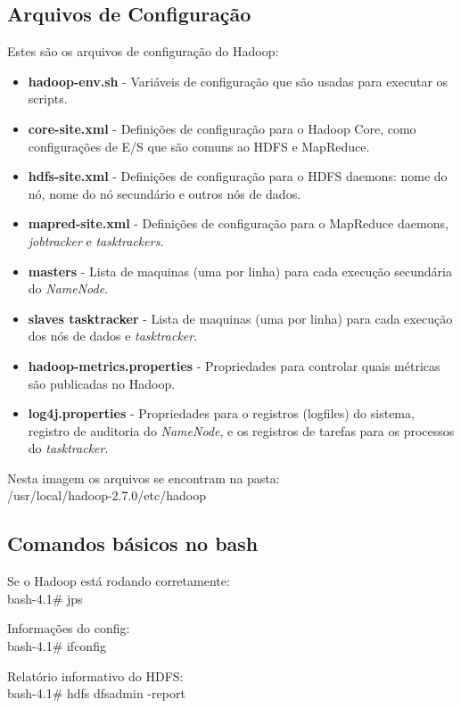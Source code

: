 \documentclass[a4paper,11pt]{article}
\begin{document}
\subsection{Arquivos de Configuração}
Estes são os arquivos de configuração do Hadoop: \vspace{-1em}
\begin{itemize}
	\item \textbf{hadoop-env.sh} - Variáveis de configuração que são usadas para executar os scripts.
	\item \textbf{core-site.xml} - Definições de configuração para o Hadoop Core, como configurações de E/S que são comuns ao HDFS e MapReduce.
	\item \textbf{hdfs-site.xml} - Definições de configuração para o HDFS daemons: nome do nó, nome do nó secundário e outros nós de dados.
	\item \textbf{mapred-site.xml} - Definições de configuração para o MapReduce daemons, \textit{jobtracker} e \textit{tasktrackers}.
	\item \textbf{masters} - Lista de maquinas (uma por linha) para cada execução secundária do \textit{NameNode}.
	\item \textbf{slaves tasktracker} - Lista de maquinas (uma por linha) para cada execução dos nós de dados e \textit{tasktracker}.
	\item \textbf{hadoop-metrics.properties} - Propriedades para controlar quais métricas são publicadas no Hadoop.
	\item \textbf{log4j.properties} - Propriedades para o registros (logfiles) do sistema, registro de auditoria do \textit{NameNode}, e os registros de tarefas para os processos do \textit{tasktracker}.
\end{itemize}

Nesta imagem os arquivos se encontram na pasta: \\
{\ttfamily /usr/local/hadoop-2.7.0/etc/hadoop}

\subsection{Comandos básicos no bash}
Se o Hadoop está rodando corretamente: \\
{\ttfamily bash-4.1\# jps}

Informações do config: \\
{\ttfamily bash-4.1\# ifconfig}

Relatório informativo do HDFS: \\
{\ttfamily bash-4.1\# hdfs dfsadmin -report}
\end{document}
